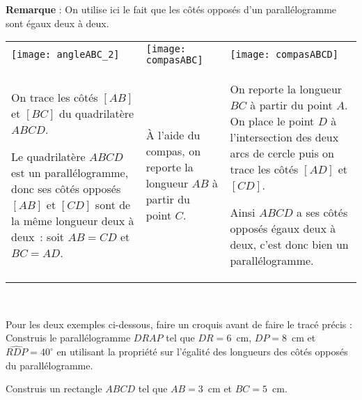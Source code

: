 \begin{methode*1}

 
\vspace{0.8em}
\textcolor{H1}{\textbf{Remarque}} : On utilise ici le fait que les côtés opposés d'un parallélogramme sont égaux deux à deux.

 \begin{exemple*1}
 
  \begin{tabularx}{\textwidth}{X|X|X}
 \qquad \texttt{[image: angleABC\_2]} & \qquad \texttt{[image: compasABC]} & \texttt{[image: compasABCD]}  \\ 
 On trace les côtés $[AB]$ et $[BC]$ du quadrilatère $ABCD$.
 
 Le quadrilatère $ABCD$ est un parallélogramme, donc ses côtés opposés $[AB]$ et $[CD]$ sont de la même longueur deux à deux : soit $AB = CD$ et $BC = AD$. & À l'aide du compas, on reporte la longueur $AB$ à partir du point $C$. & On reporte la longueur $BC$ à partir du point $A$. On place le point $D$ à l'intersection des deux arcs de cercle puis on trace les côtés $[AD]$ et $[CD]$.
 
Ainsi $ABCD$ a ses côtés opposés égaux deux à deux, c'est donc bien un parallélogramme.\\
\end{tabularx} \\
 
 \end{exemple*1}

\vspace*{1em}
Pour les deux exemples ci-dessous, faire un croquis avant de faire le tracé précis :\\[-2.5em]

\exercice
Construis le parallélogramme $DRAP$ tel que $DR = 6$ cm, $DP = 8$ cm et $\widehat{RDP} = 40^\circ$ en utilisant la propriété sur l'égalité des longueurs des côtés opposés du parallélogramme.

\vspace{2.7cm}

\exercice
Construis un rectangle $ABCD$ tel que $AB = 3$ cm et $BC = 5$ cm.

\end{methode*1}


